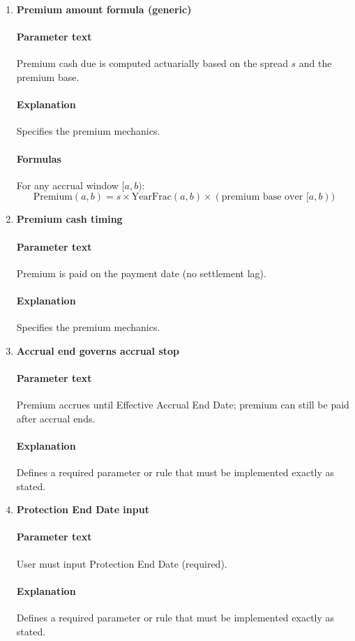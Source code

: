 \documentclass[11pt]{article}
\begin{document}
\begin{enumerate}[label=\arabic*),leftmargin=*,align=left]
\item \textbf{Premium amount formula (generic)}
\paragraph{Parameter text} Premium cash due is computed actuarially based on the spread $s$ and the premium base.
\paragraph{Explanation} Specifies the premium mechanics.
\paragraph{Formulas} For any accrual window $[a,b)$:
\[ \text{Premium}(a,b) = s \times \text{YearFrac}(a,b) \times (\text{premium base over } [a,b)) \]

\item \textbf{Premium cash timing}
\paragraph{Parameter text} Premium is paid on the payment date (no settlement lag).
\paragraph{Explanation} Specifies the premium mechanics.

\item \textbf{Accrual end governs accrual stop}
\paragraph{Parameter text} Premium accrues until Effective Accrual End Date; premium can still be paid after accrual ends.
\paragraph{Explanation} Defines a required parameter or rule that must be implemented exactly as stated.

\item \textbf{Protection End Date input}
\paragraph{Parameter text} User must input Protection End Date (required).
\paragraph{Explanation} Defines a required parameter or rule that must be implemented exactly as stated.


\end{enumerate}
\end{document}
